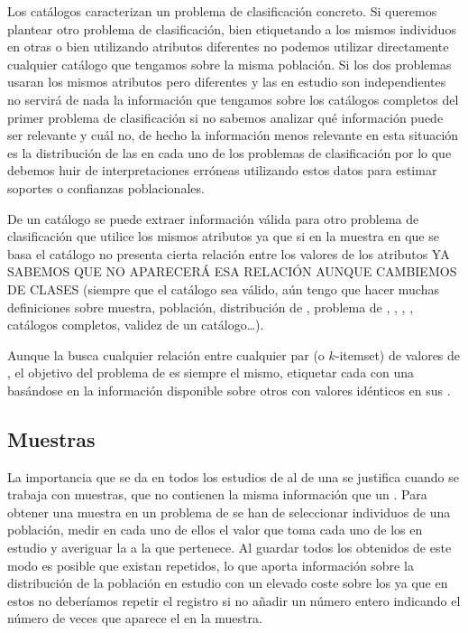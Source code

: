 Los catálogos caracterizan un problema de clasificación concreto. Si queremos plantear otro problema de clasificación, bien etiquetando a los mismos individuos en otras \clases o bien utilizando atributos diferentes no podemos utilizar directamente cualquier catálogo que tengamos sobre la misma población. Si los dos problemas usaran los mismos atributos pero diferentes \clases y las \clases en estudio son independientes no servirá de nada la información que tengamos sobre los catálogos completos del primer problema de clasificación si no sabemos analizar qué información puede ser relevante y cuál no, de hecho la información menos relevante en esta situación es la distribución de las \clases en cada uno de los problemas de clasificación por lo que debemos huir de interpretaciones erróneas utilizando estos datos para estimar soportes o confianzas poblacionales.

De un catálogo se puede extraer información válida para otro problema de clasificación que utilice los mismos atributos ya que si en la muestra en que se basa el catálogo no presenta cierta relación entre los valores de los atributos YA SABEMOS QUE NO APARECERÁ ESA RELACIÓN AUNQUE CAMBIEMOS DE CLASES (siempre que el catálogo sea válido, aún tengo que hacer muchas definiciones sobre muestra, población, distribución de \clases, problema de \clasificacion, \atributos, \clases, \catalogos, catálogos completos, validez de un catálogo\ldots).

Aunque la \ARM busca cualquier relación entre cualquier par (o $k$-itemset) de valores de \D, el objetivo del problema de \clasificacion es siempre el mismo, etiquetar cada \registro con una \clase basándose en la información disponible sobre otros \registros con valores idénticos en sus \atributos.





\subsection{Muestras}
\label{sec:clasificacion:catalogo:muestras}
La importancia que se da en todos los estudios de \ARM al \soporte de una \ar se justifica cuando se trabaja con muestras, que no contienen la misma información que un \catalogo. Para obtener una muestra en un problema de \clasificacion se han de seleccionar individuos de una población, medir en cada uno de ellos el valor que toma cada uno de los \atributos en estudio y averiguar la \clase a la que pertenece. Al guardar todos los \registros obtenidos de este modo es posible que existan \registros repetidos, lo que aporta información sobre la distribución de la población en estudio con un elevado coste sobre los \catalogos ya que en estos no deberíamos repetir el registro si no añadir un número entero indicando el número de veces que aparece el \registro en la muestra.

